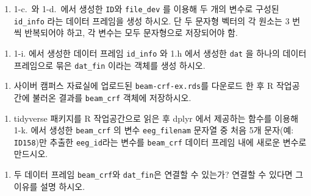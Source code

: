 \documentclass[
  11pt,
]{krantz}
\providecommand{\tightlist}{%
  \setlength{\itemsep}{0pt}\setlength{\parskip}{0pt}}
\begin{document}
\footnotesize

\normalsize

\begin{enumerate}
\def\labelenumi{\roman{enumi}.}
\tightlist
\item
  1-c.~와 1-d.~에서 생성한 \texttt{ID}와 \texttt{file\_dev} 를 이용해 두 개의 변수로 구성된 \texttt{id\_info} 라는 데이터 프레임을 생성 하시오. 단 두 문자형 벡터의 각 원소는 3 번씩 반복되어야 하고, 각 변수는 모두 문자형으로 저장되어야 함.
\end{enumerate}

\footnotesize

\normalsize

\begin{enumerate}
\def\labelenumi{\alph{enumi}.}
\setcounter{enumi}{9}
\tightlist
\item
  1-i. 에서 생성한 데이터 프레임 \texttt{id\_info} 와 1.h 에서 생성한 \texttt{dat} 을 하나의 데이터 프레임으로 묶은 \texttt{dat\_fin} 이라는 객체를 생성 하시오.
\end{enumerate}

\footnotesize

\normalsize

\begin{enumerate}
\def\labelenumi{\alph{enumi}.}
\setcounter{enumi}{10}
\tightlist
\item
  사이버 캠퍼스 자료실에 업로드된 \texttt{beam-crf-ex.rds}를 다운로드 한 후 R 작업공간에 불러온 결과를 \texttt{beam\_crf} 객체에 저장하시오.
\end{enumerate}

\footnotesize

\normalsize

\begin{enumerate}
\def\labelenumi{\alph{enumi}.}
\setcounter{enumi}{11}
\tightlist
\item
  tidyverse 패키지를 R 작업공간으로 읽은 후 dplyr 에서 제공하는 함수를 이용해 1-k. 에서 생성한 \texttt{beam\_crf} 의 변수 \texttt{eeg\_filenam} 문자열 중 처음 5개 문자(예: \texttt{ID158})만 추출한 \texttt{eeg\_id}라는 변수를 \texttt{beam\_crf} 데이터 프레임 내에 새로운 변수로 만드시오.
\end{enumerate}

\footnotesize

\normalsize

\begin{enumerate}
\def\labelenumi{\alph{enumi}.}
\setcounter{enumi}{12}
\tightlist
\item
  두 데이터 프레임 \texttt{beam\_crf}와 \texttt{dat\_fin}은 연결할 수 있는가? 연결할 수 있다면 그 이유를 설명 하시오.
\end{enumerate}
\end{document}
